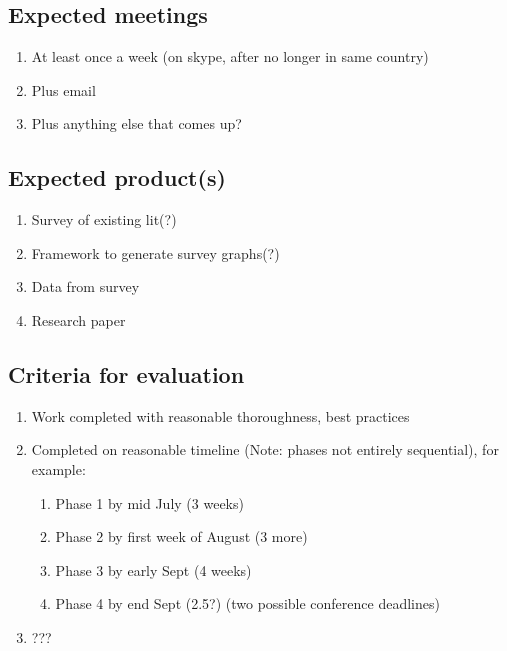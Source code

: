 \documentclass[12pt, twocolumn]{article}
\begin{document}
\subsection{Expected meetings}
\begin{enumerate}
	\item At least once a week (on skype, after no longer in same country)
	\item Plus email
	\item Plus anything else that comes up?
\end{enumerate}
\subsection{Expected product(s)}
\begin{enumerate}
	\item Survey of existing lit(?)
	\item Framework to generate survey graphs(?)
	\item Data from survey
	\item Research paper
\end{enumerate}
\subsection{Criteria for evaluation}
\begin{enumerate}
	\item Work completed with reasonable thoroughness, best practices
	\item Completed on reasonable timeline (Note: phases not entirely sequential), for example:
	\begin{enumerate}
		\item Phase 1 by mid July (3 weeks)
		\item Phase 2 by first week of August (3 more)
		\item Phase 3 by early Sept (4 weeks)
		\item Phase 4 by end Sept (2.5?) (two possible conference deadlines)
	\end{enumerate}
	\item ???
\end{enumerate}
\end{document}
